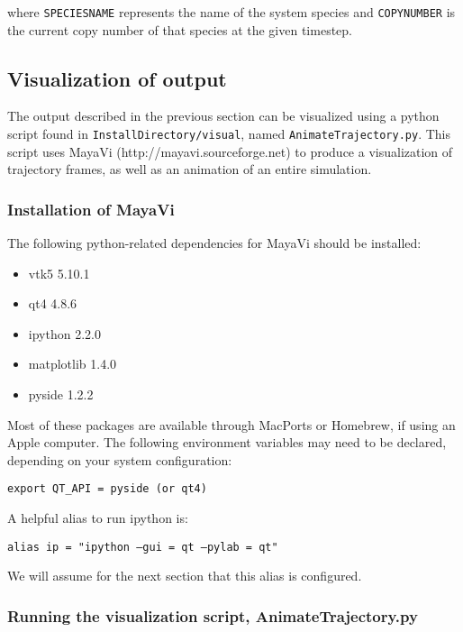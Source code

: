 \documentclass[11pt, oneside]{article}   	%
\begin{document}
\noindent where \texttt{SPECIESNAME} represents the name of the system species and \texttt{COPYNUMBER} is the current copy number of that species at the given timestep.

\subsection{Visualization of output}

The output described in the previous section can be visualized using a python script found in \texttt{InstallDirectory/visual}, named \texttt{AnimateTrajectory.py}. This script uses MayaVi (http://mayavi.sourceforge.net) to produce a visualization of trajectory frames, as well as an animation of an entire simulation.

\subsubsection{Installation of MayaVi}

The following python-related dependencies for MayaVi should be installed:
\begin{itemize}
\item vtk5 5.10.1
\item qt4 4.8.6
\item ipython 2.2.0
\item matplotlib 1.4.0
\item pyside 1.2.2
\end{itemize}

\noindent Most of these packages are available through MacPorts or Homebrew, if using an Apple computer. The following environment variables
may need to be declared, depending on your system configuration:\newline

\texttt{export QT\_API = pyside (or qt4)}\newline

\noindent A helpful alias to run ipython is:\newline

\texttt{alias ip = "ipython --gui = qt --pylab = qt"}\newline

\noindent We will assume for the next section that this alias is configured.

\subsubsection{Running the visualization script, AnimateTrajectory.py}
\end{document}
